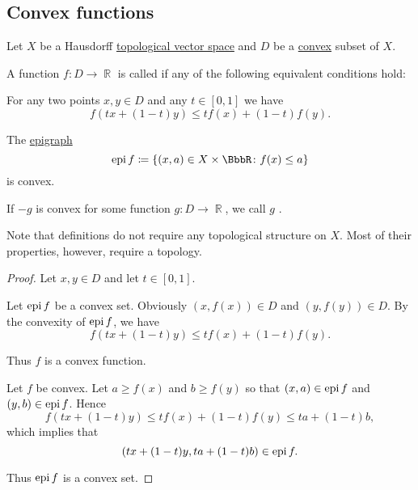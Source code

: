 \subsection{Convex functions}\label{subsec:convex_functions}

Let \( X \) be a Hausdorff \hyperref[def:topological_vector_space]{topological vector space} and \( D \) be a \hyperref[def:convex_set]{convex} subset of \( X \).

\begin{definition}\label{def:convex_functions}
  A function \( f: D \to \BbbR \) is called  if any of the following equivalent conditions hold:

  \begin{thmenum}
     For any two points \( x, y \in D \) and any \( t \in [0, 1] \) we have
    \begin{equation*}
      f(tx + (1-t)y) \leq tf(x) + (1-t)f(y).
    \end{equation*}

     The \hyperref[def:epigraph]{epigraph}
    \begin{equation*}
      \epi f \coloneqq \{ (x, a) \in X \times \BbbR \colon f(x) \leq a \}
    \end{equation*}
    is convex.
  \end{thmenum}

  If \( -g \) is convex for some function \( g: D \to \BbbR \), we call \( g \) .

  Note that definitions do not require any topological structure on \( X \). Most of their properties, however, require a topology.
\end{definition}
\begin{proof}
  Let \( x, y \in D \) and let \( t \in [0, 1] \).

   Let \( \operatorname{epi} f \) be a convex set. Obviously \( (x, f(x)) \in D \) and \( (y, f(y)) \in D \). By the convexity of \( \operatorname{epi} f \), we have
  \begin{equation*}
    f(tx + (1-t)y) \leq tf(x) + (1-t)f(y).
  \end{equation*}

  Thus \( f \) is a convex function.

   Let \( f \) be convex. Let \( a \geq f(x) \) and \( b \geq f(y) \) so that \( (x, a) \in \operatorname{epi} f \) and \( (y, b) \in \operatorname{epi} f \). Hence
  \begin{equation*}
    f(tx + (1-t)y) \leq tf(x) + (1-t)f(y) \leq ta + (1-t)b,
  \end{equation*}
  which implies that
  \begin{equation*}
    (tx + (1-t)y, ta + (1-t)b) \in \operatorname{epi} f.
  \end{equation*}

  Thus \( \operatorname{epi} f \) is a convex set.
\end{proof}

